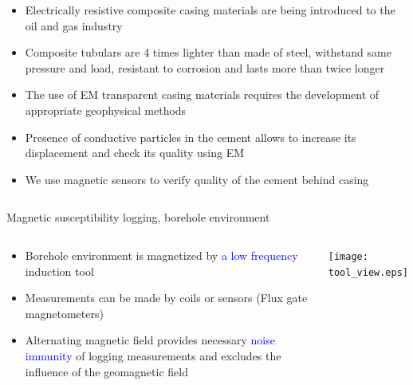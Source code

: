 \documentclass[aspectratio=169]{beamer}
\begin{document}
\begin{frame}
\begin{columns}[c]
\begin{small}
\begin{itemize}

\item Electrically resistive composite casing materials are being introduced to the oil and gas industry
\item Composite tubulars are 4 times lighter than made of steel, withstand same pressure and load, resistant to corrosion and lasts more than twice longer
\item The use of EM transparent casing materials requires the development of appropriate geophysical methods
\item Presence of conductive particles in the cement allows to increase its displacement and check its quality using EM 
\item We use magnetic sensors to verify quality of the cement behind casing

\end{itemize}
\end{small}

\vspace{2.5cm}

\end{columns}

\end{frame}
%
%
\begin{frame}{Magnetic susceptibility logging, borehole environment}

\begin{columns}[c] 

\begin{block}{}
\begin{itemize}
	\item Borehole environment is magnetized  by \textcolor{blue} {a low frequency} induction tool
	\item Measurements can be made by coils or sensors (Flux gate magnetometers)
	\item Alternating magnetic field provides necessary  \textcolor{blue} {noise immunity} of logging measurements and excludes the influence of the geomagnetic field
\end{itemize}

\end{block}


\texttt{[image: tool\_view.eps]}
\end{columns}


\end{frame}
%
%
\end{document}
